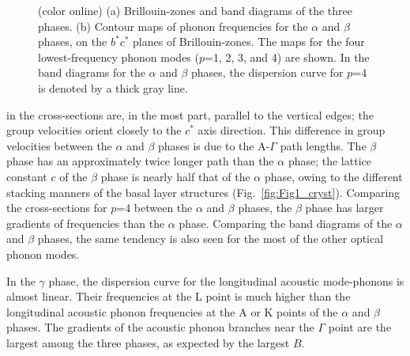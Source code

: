 \documentclass[twocolumn,amsmath,amssymb,a4paper,prb,superscriptaddress,floatfix]{revtex4-1}
\begin{document}
\begin{figure}[H]
\begin{center}
                   \caption{(color online) (a) Brillouin-zones and  band diagrams of the three phases. (b) Contour maps
                           of phonon frequencies for the $\alpha$ and $\beta$ phases, on the  $b^*c^*$  planes of Brillouin-zones.
                           The maps for the four lowest-frequency phonon modes ($p$=1, 2, 3,
                           and 4) are shown. In the band diagrams for the $\alpha$ and
                           $\beta$ phases, the dispersion curve for $p$=4 is denoted by a thick gray line.
                   \label{fig:Fig4_ver5_338} }
    \end{center}
\end{figure}
\noindent
in the cross-sections are, in the
most part, parallel to the vertical edges; the group velocities orient closely
to the $c^*$ axis direction.
This difference in group velocities between the $\alpha$ and $\beta$ phases is due to the A-$\Gamma$
path lengths. The $\beta$ phase has an approximately twice longer path than the
$\alpha$ phase; the lattice constant $c$ of the $\beta$ phase is nearly half
that of the $\alpha$ phase, owing to the different stacking manners of the basal
layer structures (Fig.~\ref{fig:Fig1_cryst}).  Comparing the cross-sections for
$p$=4 between the $\alpha$ and $\beta$ phases, the $\beta$
phase has larger gradients of frequencies than the $\alpha$ phase.  Comparing the
band diagrams of the $\alpha$ and $\beta$ phases, the same tendency is also seen
for the most of the other optical phonon modes.

In the $\gamma$ phase, the dispersion curve for the longitudinal acoustic
mode-phonons is almost linear. Their frequencies at the L point is much higher than the
longitudinal acoustic phonon frequencies at the A or K points of the $\alpha$
and $\beta$ phases.  The gradients of the acoustic phonon branches near the
$\Gamma$ point are the largest among the three phases, as expected by the
largest $B$.

\onecolumngrid
\end{document}
